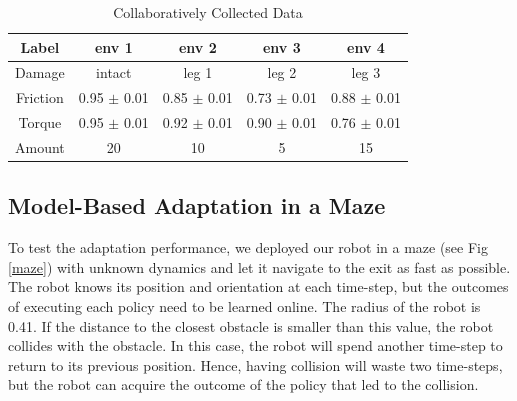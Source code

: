 \begin{table}
\caption{Collaboratively Collected Data}
\centering
\def\arraystretch{1.2}
\begin{tabular}{|c||c|c|c|c|}
\hline
Label & env 1 & env 2 & env 3 & env 4\\
\hline
Damage & intact & leg 1 & leg 2 & leg 3 \\
\hline
Friction & 0.95 $\pm$ 0.01 & 0.85 $\pm$ 0.01 & 0.73 $\pm$ 0.01 & 0.88 $\pm$ 0.01 \\
\hline
Torque & 0.95 $\pm$ 0.01 & 0.92 $\pm$ 0.01 & 0.90 $\pm$ 0.01 & 0.76 $\pm$ 0.01 \\
\hline
Amount & 20 & 10 & 5 & 15 \\
\hline
\end{tabular}
\label{data}
\end{table}



\subsection{Model-Based Adaptation in a Maze}
To test the adaptation performance, we deployed our robot in a maze (see Fig \ref{maze}) with unknown dynamics and let it navigate to the exit as fast as possible.
The robot knows its position and orientation at each time-step, but the outcomes of executing each policy need to be learned online.
The radius of the robot is 0.41.
If the distance to the closest obstacle is smaller than this value, the robot collides with the obstacle.
In this case, the robot will spend another time-step to return to its previous position.
Hence, having collision will waste two time-steps, but the robot can acquire the outcome of the policy that led to the collision.



